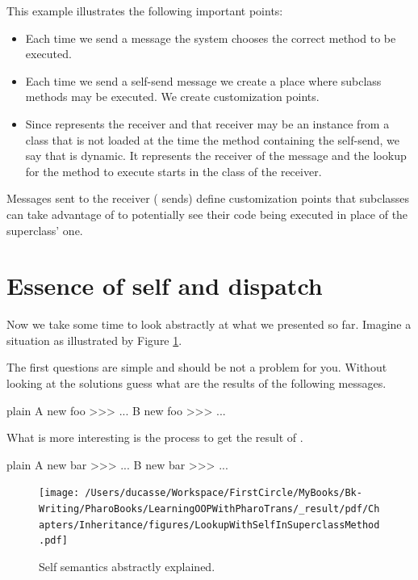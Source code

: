 \documentclass[10pt,twoside,english]{_support/latex/sbabook/sbabook}
\begin{document}
This example illustrates the following important points:

\begin{itemize}
\item Each time we send a message the system chooses the correct method to be executed.
\item Each time we send a self-send message we create a place where subclass methods may be executed. We create customization points.
\item Since  represents the receiver and that receiver may be an instance from a class that is not loaded at the time the method containing the self-send, we say that  is dynamic. It represents the receiver of the message and the lookup for the method to execute starts in the class of the receiver. 
\end{itemize}

\begin{important}
Messages sent to the receiver ( sends) define customization points that subclasses can take advantage of to potentially see their code being executed in place of the superclass' one.
\end{important}
\section{Essence of self and dispatch}
Now we take some time to look abstractly at what we presented so far. 
Imagine a situation as illustrated by Figure \ref{fig:LookupWithSelfInSuperclassMethod}.

The first questions are simple and should be not a problem for you. Without looking at the solutions guess what are the results of the following messages.

\begin{displaycode}{plain}
A new foo
>>> ... 
B new foo
>>> ...
\end{displaycode}

What is more interesting is the process to get the result of .

\begin{displaycode}{plain}
A new bar
>>> ...
B new bar
>>> ...
\end{displaycode}


\begin{figure}

\begin{center}
\texttt{[image: /Users/ducasse/Workspace/FirstCircle/MyBooks/Bk-Writing/PharoBooks/LearningOOPWithPharoTrans/\_result/pdf/Chapters/Inheritance/figures/LookupWithSelfInSuperclassMethod.pdf]}\caption{Self semantics abstractly explained.\label{fig:LookupWithSelfInSuperclassMethod}}\end{center}
\end{figure}
\end{document}
